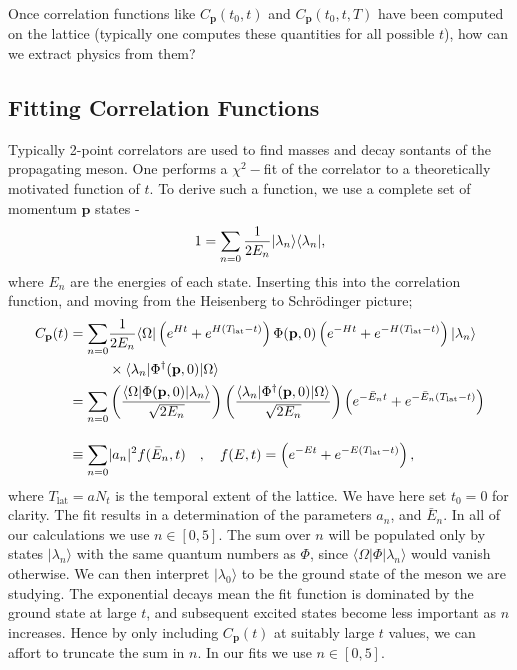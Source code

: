Once correlation functions like $C_{\textbf{p}}(t_0,t)$ and $C_{\textbf{p}}(t_0,t,T)$ have been computed on the lattice (typically one computes these quantities for all possible $t$), how can we extract physics from them?

\subsection{Fitting Correlation Functions}
\label{sec:correlator_fits}

Typically 2-point correlators are used to find masses and decay sontants of the propagating meson. One performs a $\chi^2-$fit of the correlator to a theoretically motivated function of $t$. To derive such a function, we use a complete set of momentum ${\textbf{p}}$ states -
\begin{align}
  1 = \sum_{n=0} {1\over 2E_n} | \lambda_n \rangle \langle \lambda_n |,
\end{align}
where $E_n$ are the energies of each state. Inserting this into the correlation function, and moving from the Heisenberg to Schr\"odinger picture;
\begin{align}
  C_{{\textbf{p}}}(t) = \sum_{n=0}& {1\over 2E_n} \langle \Omega | \left( e^{Ht} + e^{H(T_{\text{lat}}-t)} \right)  \Phi({\textbf{p}},0) \left( e^{-Ht} + e^{-H(T_{\text{lat}}-t)} \right) | \lambda_n \rangle
  \nonumber
  \\&\times \langle \lambda_n | \Phi^{\dagger}({\textbf{p}},0) | \Omega \rangle
  \nonumber
  \\ = \sum_{n=0}& \left( {\langle \Omega | \Phi({\textbf{p}},0) | \lambda_n \rangle \over \sqrt{2E_n}} \right) \left( {\langle \lambda_n | \Phi^{\dagger}({\textbf{p}},0) | \Omega \rangle \over \sqrt{2E_n} } \right) \left( e^{-\bar{E}_n t} + e^{-\bar{E}_n (T_{\text{lat}}-t)} \right)
  \nonumber
  \\[10pt] \equiv \sum_{n=0}& |a_n|^2 f(\bar{E}_n,t) \quad,\quad f(E,t) = \left( e^{-E t} + e^{-E(T_{\text{lat}}-t)} \right),
  \label{eq:multiexponential}
\end{align}
where $T_{\text{lat}}=aN_t$ is the temporal extent of the lattice. We have here set $t_0=0$ for clarity. The fit results in a determination of the parameters $a_n$, and $\bar{E}_n$. In all of our calculations we use $n\in[0,5]$. The sum over $n$ will be populated only by states $|\lambda_n\rangle$ with the same quantum numbers as $\Phi$, since $\langle\Omega | \Phi | \lambda_n \rangle$ would vanish otherwise. We can then interpret $|\lambda_0\rangle$ to be the ground state of the meson we are studying. The exponential decays mean the fit function is dominated by the ground state at large $t$, and subsequent excited states become less important as $n$ increases. Hence by only including $C_{{\textbf{p}}}(t)$ at suitably large $t$ values, we can affort to truncate the sum in $n$. In our fits we use $n\in[0,5]$.


